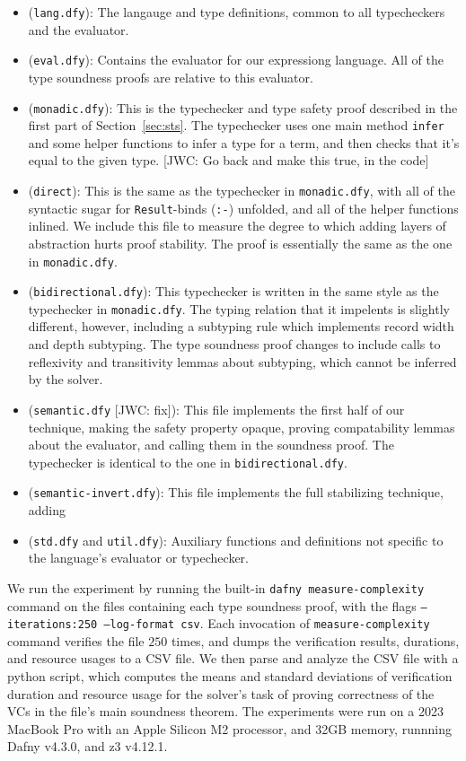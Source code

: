 \documentclass[sigplan,review,screen,anonymous]{acmart}
\newcommand{\comm}[3]{\textcolor{#1}{[#2: #3]}}
\newcommand{\jwc}[1]{\comm{dkgreen}{JWC}{#1}}
\begin{document}
\begin{itemize}
  \item (\texttt{lang.dfy}): The langauge and type definitions, common to all typecheckers and the evaluator.
  \item (\texttt{eval.dfy}): Contains the evaluator for our expressiong language. All of the type soundness proofs are relative to this evaluator.
  \item (\texttt{monadic.dfy}): This is the typechecker and type safety proof described in
  the first part of Section~\ref{sec:sts}.  The typechecker uses one main method
  \texttt{infer} and some helper functions to infer a type for a term, and then checks
  that it's equal to the given type. \jwc{Go back and make this true, in the code}
  \item (\texttt{direct}): This is the same as the typechecker in \texttt{monadic.dfy}, with all of the
  syntactic sugar for \texttt{Result}-binds (\texttt{:-}) unfolded, and all of the helper
  functions inlined. We include this file to measure the degree to which adding
  layers of abstraction hurts proof stability. The proof is essentially the same as the one in \texttt{monadic.dfy}.
  \item (\texttt{bidirectional.dfy}): This typechecker is written in the same style as the typechecker in \texttt{monadic.dfy}. The typing relation that it impelents is slightly different,
        however, including a subtyping rule which implements record width and depth subtyping.
        The type soundness proof changes to include calls to reflexivity and transitivity lemmas about subtyping, which cannot be inferred by the solver.
  \item (\texttt{semantic.dfy} \jwc{fix}):
        This file implements the first half of our technique, making the safety
        property opaque, proving compatability lemmas about the evaluator, and
        calling them in the soundness proof.  The typechecker is identical to
        the one in \texttt{bidirectional.dfy}.
  \item (\texttt{semantic-invert.dfy}): This file implements the full stabilizing technique, adding
  \item (\texttt{std.dfy} and \texttt{util.dfy}): Auxiliary functions and definitions not specific to the language's evaluator or typechecker.
\end{itemize}

We run the experiment by running the built-in \texttt{dafny measure-complexity}
command on the files containing each type soundness proof, with the flags \texttt{--iterations:250 --log-format csv}.
Each invocation of \texttt{measure-complexity} command verifies the file $250$ times, and dumps
the verification results, durations, and resource usages to a CSV file. We then parse and analyze the CSV
file with a python script, which computes the means and standard deviations of verification duration and resource usage for the solver's task of proving correctness
of the VCs in the file's main soundness theorem.
The experiments were run on a 2023 MacBook Pro with an Apple Silicon M2 processor, and 32GB memory, runnning Dafny v4.3.0, and z3 v4.12.1.
\end{document}
